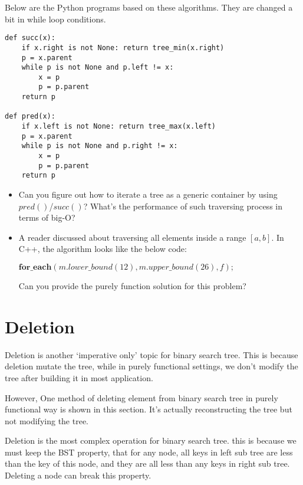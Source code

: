 \documentclass[UTF8]{article}
\begin{document}
Below are the Python programs based on these algorithms. They are changed
a bit in while loop conditions.

\lstset{language=Python}
\begin{lstlisting}
def succ(x):
    if x.right is not None: return tree_min(x.right)
    p = x.parent
    while p is not None and p.left != x:
        x = p
        p = p.parent
    return p

def pred(x):
    if x.left is not None: return tree_max(x.left)
    p = x.parent
    while p is not None and p.right != x:
        x = p
        p = p.parent
    return p
\end{lstlisting}

\begin{Exercise}

\begin{itemize}
\item Can you figure out how to iterate a tree as a generic container
by using $pred()$/$succ()$? What's the performance of such traversing
process in terms of big-O?

\item A reader discussed about traversing all elements inside a
range $[a, b]$. In C++, the algorithm looks like the below code:

$\mathbf{for\_each} (m.lower\_bound(12), m.upper\_bound(26), f);$

Can you provide the purely function solution for this problem?
\end{itemize}

\end{Exercise}

\section{Deletion}
Deletion is another `imperative only' topic for binary search tree.
This is because deletion mutate the tree, while in purely functional
settings, we don't modify the tree after building it in most
application.

However, One method of deleting element from binary search
tree in purely functional way is shown in this section. It's actually
reconstructing the tree but not modifying the tree.

Deletion is the most complex operation for binary search tree.
this is because we must keep the BST property, that for any node,
all keys in left sub tree are less than the key of this node, and
they are all less than any keys in right sub tree. Deleting a node
can break this property.
\end{document}
